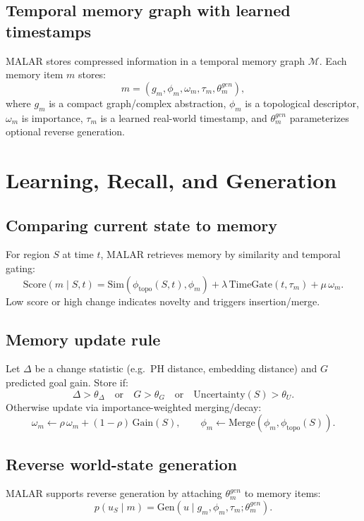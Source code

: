 \documentclass[11pt,english]{article}
\theoremstyle{remark}
\begin{document}
\subsection{Temporal memory graph with learned timestamps}
MALAR stores compressed information in a temporal memory graph $\mathcal{M}$. Each memory item $m$ stores:
\begin{equation}
m = (g_m, \phi_m, \omega_m, \tau_m, \theta_m^{gen}),
\end{equation}
where $g_m$ is a compact graph/complex abstraction, $\phi_m$ is a topological descriptor, $\omega_m$ is importance,
$\tau_m$ is a learned real-world timestamp, and $\theta_m^{gen}$ parameterizes optional reverse generation.



\section{Learning, Recall, and Generation}
\subsection{Comparing current state to memory}
For region $S$ at time $t$, MALAR retrieves memory by similarity and temporal gating:
\begin{equation}
\text{Score}(m\mid S,t) = \text{Sim}(\phi_{\text{topo}}(S,t),\phi_m) + \lambda\,\text{TimeGate}(t,\tau_m) + \mu\,\omega_m.
\end{equation}
Low score or high change indicates novelty and triggers insertion/merge.

\subsection{Memory update rule}
Let $\Delta$ be a change statistic (e.g.\ PH distance, embedding distance) and $G$ predicted goal gain. Store if:
\begin{equation}
\Delta > \theta_\Delta \quad \text{or}\quad G>\theta_G \quad \text{or}\quad \text{Uncertainty}(S)>\theta_U.
\end{equation}
Otherwise update via importance-weighted merging/decay:
\begin{equation}
\omega_m \leftarrow \rho\,\omega_m + (1-\rho)\,\text{Gain}(S),\qquad
\phi_m \leftarrow \text{Merge}(\phi_m,\phi_{\text{topo}}(S)).
\end{equation}



\subsection{Reverse world-state generation}
MALAR supports reverse generation by attaching $\theta_m^{gen}$ to memory items:
\begin{equation}
p(u_S\mid m) = \text{Gen}(u \mid g_m,\phi_m,\tau_m;\theta_m^{gen}).
\end{equation}
\end{document}
